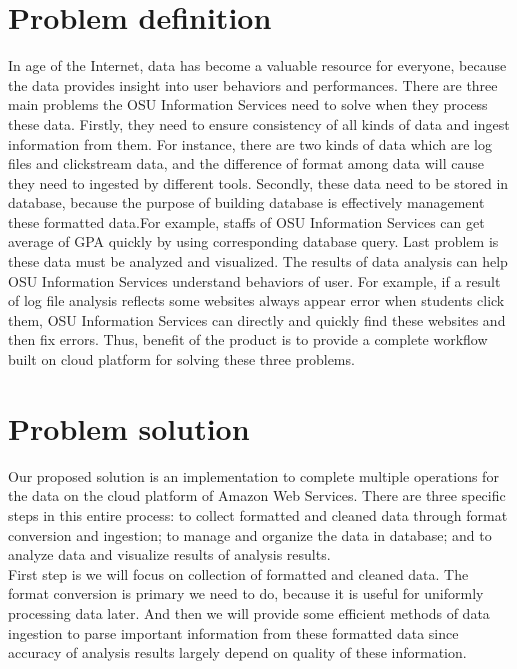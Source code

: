 \documentclass[letterpaper,10pt]{article}
\begin{document}
	\section{Problem definition}
    In age of the Internet, data has become a valuable resource for everyone, because the data provides insight into user behaviors and performances. There are three main problems the OSU Information Services need to solve when they process these data. Firstly, they need to ensure consistency of all kinds of data and ingest information from them. For instance, there are two kinds of data which are log files and clickstream data, and the difference of format among data will cause they need to ingested by different tools. Secondly, these data need to be stored in database, because the purpose of building database is effectively management these formatted data.For example, staffs of OSU Information Services can get average of GPA quickly by using corresponding database query. Last problem is these data must be analyzed and visualized. The results of data analysis can help OSU Information Services understand behaviors of user. For example, if a result of log file analysis reflects some websites always appear error when students click them, OSU Information Services can directly and quickly find these websites and then fix errors. Thus, benefit of the product is to provide a complete workflow built on cloud platform for solving these three problems.

	\section{Problem solution}
	Our proposed solution is an implementation to complete multiple operations for the data on the cloud platform of Amazon Web Services. There are three specific steps in this entire process: to collect formatted and cleaned data through format conversion and ingestion; to manage and organize the data in database; and to analyze data and visualize results of analysis results.\\ 

    \noindent First step is we will focus on collection of formatted and cleaned data. The format conversion is primary we need to do, because it is useful for uniformly processing data later. And then we will provide some efficient methods of data ingestion to parse important information from these formatted data since accuracy of analysis results largely depend on quality of these information.\\
 
\end{document}
